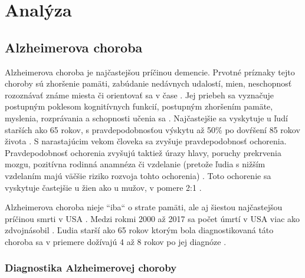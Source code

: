 \chapter{Analýza}

\section{Alzheimerova choroba \label{sec:ad}}

Alzheimerova choroba je najčastejšou príčinou demencie. Prvotné príznaky tejto choroby sú zhoršenie pamäti, zabúdanie nedávnych udalostí, mien, neschopnosť rozoznávať známe miesta či orientovať sa v čase \cite{Alzheimer.sk_2019}. Jej priebeh sa vyznačuje postupným poklesom kognitívnych funkcií, postupným zhoršením pamäte, myslenia, rozprávania a schopnosti učenia sa \cite{duthey2013background}. Najčastejšie sa vyskytuje u ľudí starších ako 65 rokov, s pravdepodobnosťou výskytu až 50\% po dovŕšení 85 rokov života \cite{duthey2013background}.
S narastajúcim vekom človeka sa zvyšuje pravdepodobnosť ochorenia. Pravdepodobnosť ochorenia zvyšujú taktiež úrazy hlavy, poruchy prekrvenia mozgu, pozitívna rodinná anamnéza či vzdelanie (pretože ľudia s nižším vzdelaním majú väčšie riziko rozvoja tohto ochorenia) \cite{Alzheimer.sk_2019}. Toto ochorenie sa vyskytuje častejšie u žien ako u mužov, v pomere 2:1 \cite{khan2016biomarkers}.

Alzheimerova choroba nieje ``iba`` o strate pamäti, ale aj šiestou najčastejšou príčinou smrti v USA \cite{Figures_2017}. Medzi rokmi 2000 až 2017 sa počet úmrtí v USA viac ako zdvojnásobil \cite{Figures_2017}. Ľudia starší ako 65 rokov ktorým bola diagnostikovaná táto choroba sa v priemere dožívajú 4 až 8 rokov po jej diagnóze \cite{Figures_2017}.


\subsection{Diagnostika Alzheimerovej choroby}

